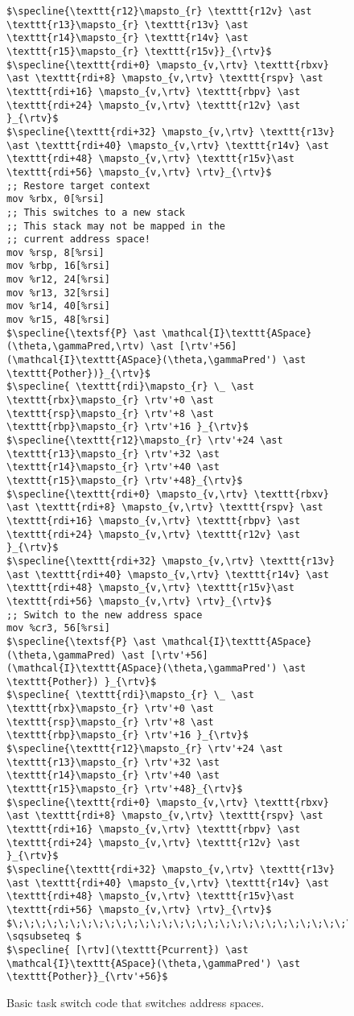 \begin{figure}
\begin{lstlisting}
$\specline{\texttt{r12}\mapsto_{r} \texttt{r12v} \ast \texttt{r13}\mapsto_{r} \texttt{r13v} \ast \texttt{r14}\mapsto_{r} \texttt{r14v} \ast \texttt{r15}\mapsto_{r} \texttt{r15v}}_{\rtv}$
$\specline{\texttt{rdi+0} \mapsto_{v,\rtv} \texttt{rbxv} \ast \texttt{rdi+8} \mapsto_{v,\rtv} \texttt{rspv} \ast \texttt{rdi+16} \mapsto_{v,\rtv} \texttt{rbpv} \ast \texttt{rdi+24} \mapsto_{v,\rtv} \texttt{r12v} \ast }_{\rtv}$
$\specline{\texttt{rdi+32} \mapsto_{v,\rtv} \texttt{r13v} \ast \texttt{rdi+40} \mapsto_{v,\rtv} \texttt{r14v} \ast \texttt{rdi+48} \mapsto_{v,\rtv} \texttt{r15v}\ast \texttt{rdi+56} \mapsto_{v,\rtv} \rtv}_{\rtv}$    
;; Restore target context
mov %rbx, 0[%rsi] 
;; This switches to a new stack
;; This stack may not be mapped in the
;; current address space!
mov %rsp, 8[%rsi] 
mov %rbp, 16[%rsi]
mov %r12, 24[%rsi]
mov %r13, 32[%rsi]
mov %r14, 40[%rsi]
mov %r15, 48[%rsi]
$\specline{\textsf{P} \ast \mathcal{I}\texttt{ASpace}(\theta,\gammaPred,\rtv) \ast [\rtv'+56](\mathcal{I}\texttt{ASpace}(\theta,\gammaPred') \ast \texttt{Pother})}_{\rtv}$
$\specline{ \texttt{rdi}\mapsto_{r} \_ \ast \texttt{rbx}\mapsto_{r} \rtv'+0 \ast  \texttt{rsp}\mapsto_{r} \rtv'+8 \ast \texttt{rbp}\mapsto_{r} \rtv'+16 }_{\rtv}$
$\specline{\texttt{r12}\mapsto_{r} \rtv'+24 \ast \texttt{r13}\mapsto_{r} \rtv'+32 \ast \texttt{r14}\mapsto_{r} \rtv'+40 \ast \texttt{r15}\mapsto_{r} \rtv'+48}_{\rtv}$
$\specline{\texttt{rdi+0} \mapsto_{v,\rtv} \texttt{rbxv} \ast \texttt{rdi+8} \mapsto_{v,\rtv} \texttt{rspv} \ast \texttt{rdi+16} \mapsto_{v,\rtv} \texttt{rbpv} \ast \texttt{rdi+24} \mapsto_{v,\rtv} \texttt{r12v} \ast }_{\rtv}$
$\specline{\texttt{rdi+32} \mapsto_{v,\rtv} \texttt{r13v} \ast \texttt{rdi+40} \mapsto_{v,\rtv} \texttt{r14v} \ast \texttt{rdi+48} \mapsto_{v,\rtv} \texttt{r15v}\ast \texttt{rdi+56} \mapsto_{v,\rtv} \rtv}_{\rtv}$
;; Switch to the new address space
mov %cr3, 56[%rsi]
$\specline{\textsf{P} \ast \mathcal{I}\texttt{ASpace}(\theta,\gammaPred) \ast [\rtv'+56](\mathcal{I}\texttt{ASpace}(\theta,\gammaPred') \ast \texttt{Pother}) }_{\rtv}$
$\specline{ \texttt{rdi}\mapsto_{r} \_ \ast \texttt{rbx}\mapsto_{r} \rtv'+0 \ast  \texttt{rsp}\mapsto_{r} \rtv'+8 \ast \texttt{rbp}\mapsto_{r} \rtv'+16 }_{\rtv}$
$\specline{\texttt{r12}\mapsto_{r} \rtv'+24 \ast \texttt{r13}\mapsto_{r} \rtv'+32 \ast \texttt{r14}\mapsto_{r} \rtv'+40 \ast \texttt{r15}\mapsto_{r} \rtv'+48}_{\rtv}$
$\specline{\texttt{rdi+0} \mapsto_{v,\rtv} \texttt{rbxv} \ast \texttt{rdi+8} \mapsto_{v,\rtv} \texttt{rspv} \ast \texttt{rdi+16} \mapsto_{v,\rtv} \texttt{rbpv} \ast  \texttt{rdi+24} \mapsto_{v,\rtv} \texttt{r12v} \ast }_{\rtv}$
$\specline{\texttt{rdi+32} \mapsto_{v,\rtv} \texttt{r13v} \ast \texttt{rdi+40} \mapsto_{v,\rtv} \texttt{r14v} \ast \texttt{rdi+48} \mapsto_{v,\rtv} \texttt{r15v}\ast \texttt{rdi+56} \mapsto_{v,\rtv} \rtv}_{\rtv}$
$\;\;\;\;\;\;\;\;\;\;\;\;\;\;\;\;\;\;\;\;\;\;\;\;\;\;\;\;\;\;\;\;\;\;\;\;\;\;\;\;\;\;\;\; \sqsubseteq $
$\specline{ [\rtv](\texttt{Pcurrent}) \ast \mathcal{I}\texttt{ASpace}(\theta,\gammaPred') \ast \texttt{Pother}}_{\rtv'+56}$
\end{lstlisting}
\caption{Basic task switch code that switches address spaces.}
\label{fig:swtch}
\end{figure}

